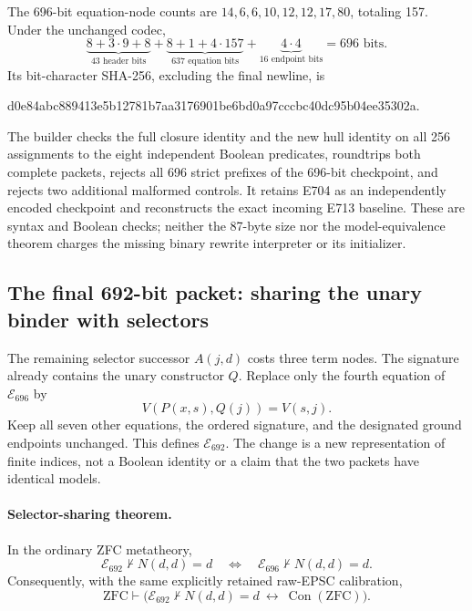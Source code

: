 The 696-bit equation-node counts are
$14,6,6,10,12,12,17,80$, totaling 157.  Under the unchanged codec,
\[
 \underbrace{8+3\cdot9+8}_{43\text{ header bits}}
 +\underbrace{8+1+4\cdot157}_{637\text{ equation bits}}
 +\underbrace{4\cdot4}_{16\text{ endpoint bits}}
 =\boxed{696\text{ bits}}.
\]
Its bit-character SHA-256, excluding the final newline, is
\begin{center}\scriptsize\ttfamily
d0e84abc889413e5b12781b7aa3176901be6bd0a97cccbc40dc95b04ee35302a.
\end{center}
The builder checks the full closure identity and the new hull identity
on all 256 assignments to the eight independent Boolean predicates,
roundtrips both complete packets, rejects all 696 strict prefixes of
the 696-bit checkpoint, and rejects two additional malformed controls.  It
retains E704 as an independently encoded checkpoint and reconstructs
the exact incoming E713 baseline.  These are syntax and Boolean
checks; neither the 87-byte size nor the model-equivalence theorem
charges the missing binary rewrite interpreter or its initializer.

\subsection{The final 692-bit packet: sharing the unary binder with selectors}
\label{sec:eq692}

The remaining selector successor $A(j,d)$ costs three term nodes.
The signature already contains the unary constructor $Q$.  Replace
only the fourth equation of $\mathcal E_{696}$ by
\begin{equation}
                 V(P(x,s),Q(j))=V(s,j).
 \label{eq:692-tail}
\end{equation}
Keep all seven other equations, the ordered signature, and the
designated ground endpoints unchanged.  This defines
$\mathcal E_{692}$.  The change is a new representation of finite
indices, not a Boolean identity or a claim that the two packets
have identical models.

\paragraph{Selector-sharing theorem.}
In the ordinary ZFC metatheory,
\[
 \mathcal E_{692}\nvdash N(d,d)=d
 \quad\Longleftrightarrow\quad
 \mathcal E_{696}\nvdash N(d,d)=d.
\]
Consequently, with the same explicitly retained raw-EPSC calibration,
\[
 \mathrm{ZFC}\vdash
 \bigl(\mathcal E_{692}\nvdash N(d,d)=d
       \ \longleftrightarrow\ \operatorname{Con}(\mathrm{ZFC})\bigr).
\]

